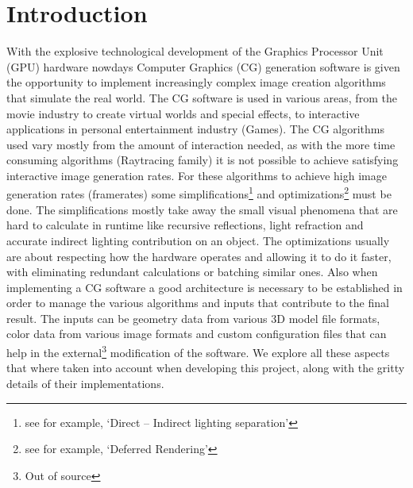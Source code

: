 \section{Introduction}
With the explosive technological development of the Graphics Processor Unit (GPU) hardware nowdays
Computer Graphics (CG) generation software is given the opportunity to implement increasingly complex image
creation algorithms that simulate the real world. The CG software is used in various areas, from the movie
industry to create virtual worlds and special effects, to interactive applications in personal entertainment
industry (Games). The CG algorithms used vary mostly from the amount of interaction needed, as with the more
time consuming algorithms (Raytracing family) it is not possible to achieve satisfying interactive image
generation rates. For these algorithms to achieve high image generation rates (framerates) some
simplifications\footnote{see for example, `Direct -- Indirect lighting separation'} and optimizations\footnote{see
for example, `Deferred Rendering'} must be done. The simplifications mostly take away the small visual phenomena
that are hard to calculate in runtime like recursive reflections, light refraction and accurate indirect lighting
contribution on an object. The optimizations usually are about respecting how the hardware operates and allowing
it to do it faster, with eliminating redundant calculations or batching similar ones. Also when implementing a
CG software a good architecture is necessary to be established in order to manage the various algorithms and
inputs that contribute to the final result. The inputs can be geometry data from various 3D model file formats,
color data from various image formats and custom configuration files that can help in the external\footnote{Out of
source} modification of the software. We explore all these aspects that where taken into account when developing
this project, along with the gritty details of their implementations.
